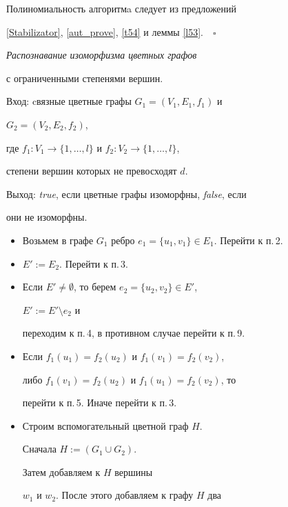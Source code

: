Полиномиальность алгоритмa следует из предложений


\ref{Stabilizator}, \ref{aut_prove}, \ref{t54} и леммы \ref{l53}.$\quad\square$





\begin{algs}


{\it Распознавание изоморфизма цветных графов


с ограниченными степенями вершин.}\label{color_iso}





Вход: cвязные цветные графы $G_1=(V_1, E_1, f_1)$ и


$G_2=(V_2, E_2, f_2)$,


где $f_1:V_1\to \{1, \dotsc, l\}$ и $f_2:V_2\to \{1, \dotsc, l\}$,


степени вершин которых не превосходят $d$.





Выход: {\it true}, если цветные графы изоморфны, {\it false}, если


они не изоморфны.


\begin{itemize}


\item[1.] Возьмем в графе $G_1$ ребро $e_1=\{u_1, v_1\}\in E_1$. Перейти к п.\,2.


\item[2.] $E':=E_2$. Перейти к п.\,3.


\item[3.] Если $E'\ne\emptyset$, то берем $e_2=\{u_2, v_2\}\in E'$,


$E':=E'\setminus e_2$ и


переходим к п.\,4, в противном случае перейти к п.\,9.


\item[4.] Если $f_1(u_1)=f_2(u_2)$ и $f_1(v_1)=f_2(v_2)$,


либо $f_1(v_1)=f_2(u_2)$ и $f_1(u_1)=f_2(v_2)$, то


перейти к п.\,5. Иначе перейти к п.\,3.


\item[5.] Строим вспомогательный цветной граф $H$.


Сначала $H:=(G_1\cup G_2)$.


Затем добавляем к $H$ вершины


$w_1$ и $w_2$. После этого добавляем к графу $H$ два



\end{itemize}
\end{algs}
